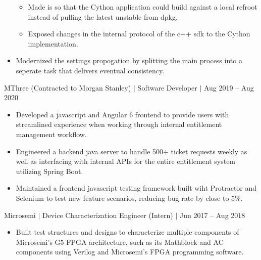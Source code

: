 \documentclass[12pt]{article}
\newcommand{\textDate}[3]{\noindent#1 $|$ #2 $|$ {\color{textGray} #3}}
\begin{document}
\begin{small}
\begin{itemize}
                \begin{itemize}[label=$\circ$,topsep=-5px,partopsep=0px]
                    \itemsep0em 
                    \item {\color{textGray} Made is so that the Cython application could build against a local refroot instead of pulling the latest unstable from dpkg.}
                    \item {\color{textGray} Exposed changes in the internal protocol of the c++ sdk to the Cython implementation.}
                \end{itemize}
            \item {\color{textGray} Modernized the settings propogation by splitting the main process into a seperate task that delivers eventual consistency.}
        \end{itemize}
    \end{small}


    \textDate{MThree (Contracted to Morgan Stanley)}{Software Developer}{Aug 2019 -- Aug 2020}
    \begin{small}
        \begin{itemize}
            \itemsep0em 
            \item {\color{textGray} Developed a javascript and Angular 6 frontend to provide users with streamlined experience when working through internal entitlement management workflow.}
            \item {\color{textGray} Engineered a backend java server to handle 500+ ticket requests weekly as well as interfacing with internal APIs for the entire entitlement system utilizing Spring Boot.}
            \item {\color{textGray} Maintained a frontend javascript testing framework built wiht Protractor and Selenium to test new feature scenarios, reducing bug rate by close to 5\%.}
        \end{itemize}
    \end{small}

    \textDate{Microsemi}{Device Characterization Engineer (Intern)}{Jun 2017 -- Aug 2018}
    \begin{small}
        \begin{itemize}
            \itemsep0em 
            \item {\color{textGray} Built test structures and designs to characterize multiple components of Microsemi's G5 FPGA architecture, such as its Mathblock and AC components using Verilog and Microsemi's FPGA programming software.}
        \end{itemize}
    \end{small}
\end{document}
